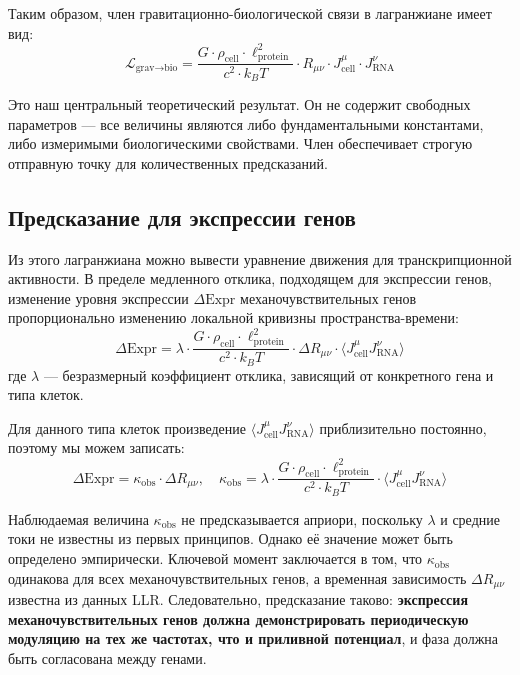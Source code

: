 \documentclass[12pt,a4paper]{article}
\theoremstyle{remark}
\begin{document}
	Таким образом, член гравитационно-биологической связи в лагранжиане имеет вид:
	\begin{equation}
		\boxed{ \mathcal{L}_{\text{grav}\to\text{bio}} = \frac{G \cdot \rho_{\text{cell}} \cdot \ell_{\text{protein}}^2}{c^2 \cdot k_B T} \cdot R_{\mu\nu} \cdot J_{\text{cell}}^\mu \cdot J_{\text{RNA}}^\nu }
		\label{eq:final}
	\end{equation}
	
	Это наш центральный теоретический результат. Он не содержит свободных параметров — все величины являются либо фундаментальными константами, либо измеримыми биологическими свойствами. Член обеспечивает строгую отправную точку для количественных предсказаний.
	
	\subsection{Предсказание для экспрессии генов}
	
	Из этого лагранжиана можно вывести уравнение движения для транскрипционной активности. В пределе медленного отклика, подходящем для экспрессии генов, изменение уровня экспрессии \(\Delta\text{Expr}\) механочувствительных генов пропорционально изменению локальной кривизны пространства-времени:
	\begin{equation}
		\Delta\text{Expr} = \lambda \cdot \frac{G \cdot \rho_{\text{cell}} \cdot \ell_{\text{protein}}^2}{c^2 \cdot k_B T} \cdot \Delta R_{\mu\nu} \cdot \langle J_{\text{cell}}^\mu J_{\text{RNA}}^\nu \rangle
		\label{eq:prediction-raw}
	\end{equation}
	где \(\lambda\) — безразмерный коэффициент отклика, зависящий от конкретного гена и типа клеток.
	
	Для данного типа клеток произведение \(\langle J_{\text{cell}}^\mu J_{\text{RNA}}^\nu \rangle\) приблизительно постоянно, поэтому мы можем записать:
	\begin{equation}
		\Delta\text{Expr} = \kappa_{\text{obs}} \cdot \Delta R_{\mu\nu}, \quad 
		\kappa_{\text{obs}} = \lambda \cdot \frac{G \cdot \rho_{\text{cell}} \cdot \ell_{\text{protein}}^2}{c^2 \cdot k_B T} \cdot \langle J_{\text{cell}}^\mu J_{\text{RNA}}^\nu \rangle
		\label{eq:prediction-simple}
	\end{equation}
	
	Наблюдаемая величина \(\kappa_{\text{obs}}\) не предсказывается априори, поскольку \(\lambda\) и средние токи не известны из первых принципов. Однако её значение может быть определено эмпирически. Ключевой момент заключается в том, что \(\kappa_{\text{obs}}\) одинакова для всех механочувствительных генов, а временная зависимость \(\Delta R_{\mu\nu}\) известна из данных LLR. Следовательно, предсказание таково: \textbf{экспрессия механочувствительных генов должна демонстрировать периодическую модуляцию на тех же частотах, что и приливной потенциал}, и фаза должна быть согласована между генами.
	
\end{document}
